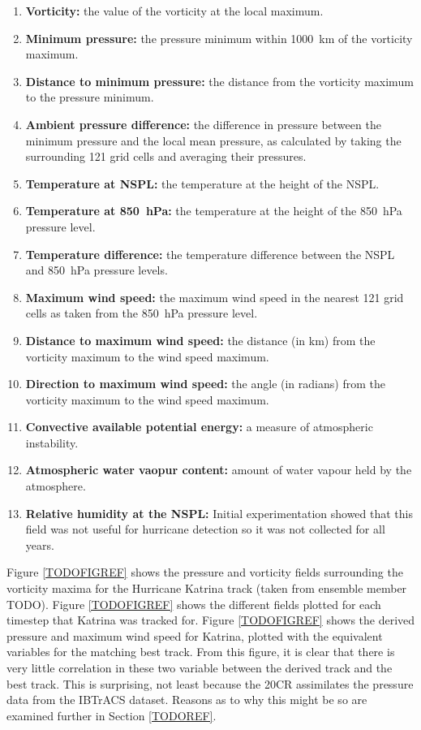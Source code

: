 \documentclass[pdftex,12pt,a4paper]{report}
\begin{document}
\begin{enumerate}
    \item \textbf{Vorticity:} the value of the vorticity at the local maximum.
    \item \textbf{Minimum pressure:} the pressure minimum within \SI{1000}{km} of the vorticity
        maximum.
    \item \textbf{Distance to minimum pressure:} the distance from the vorticity maximum to the
        pressure minimum.
    \item \textbf{Ambient pressure difference:} the difference in pressure between the minimum
        pressure and the local mean pressure, as calculated by taking the surrounding 121 grid cells
        and averaging their pressures.
    \item \textbf{Temperature at NSPL:} the temperature at the height of the NSPL.
    \item \textbf{Temperature at \SI{850}{hPa}:} the temperature at the height of the \SI{850}{hPa}
        pressure level.
    \item \textbf{Temperature difference:} the temperature difference between the NSPL and
        \SI{850}{hPa} pressure levels.
    \item \textbf{Maximum wind speed:} the maximum wind speed in the nearest 121 grid cells as taken
        from the \SI{850}{hPa} pressure level.
    \item \textbf{Distance to maximum wind speed:} the distance (in km) from the vorticity
        maximum to the wind speed maximum.
    \item \textbf{Direction to maximum wind speed:} the angle (in radians) from the vorticity
        maximum to the wind speed maximum.
    \item \textbf{Convective available potential energy:} a measure of atmospheric instability.
    \item \textbf{Atmospheric water vaopur content:} amount of water vapour held by the atmosphere.
    \item \textbf{Relative humidity at the NSPL:} Initial experimentation showed that this field was
        not useful for hurricane detection so it was not collected for all years.
\end{enumerate}

Figure \ref{TODOFIGREF} shows the pressure and vorticity fields surrounding the vorticity maxima for
the Hurricane Katrina track (taken from ensemble member TODO). Figure \ref{TODOFIGREF} shows the
different fields plotted for each timestep that Katrina was tracked for. Figure \ref{TODOFIGREF}
shows the derived pressure and maximum wind speed for Katrina, plotted with the equivalent variables
for the matching best track. From this figure, it is clear that there is very little correlation in
these two variable between the derived track and
the best track. This is surprising, not least because the 20CR assimilates the pressure data from
the IBTrACS dataset. Reasons as to why this might be so are examined further in Section
\ref{TODOREF}.
\end{document}
